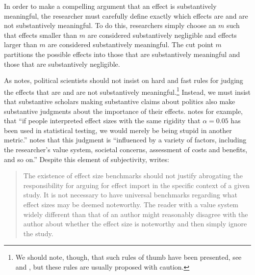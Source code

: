 \documentclass[12pt]{article}
\begin{document}
In order to make a compelling argument that an effect is substantively meaningful, the researcher must carefully define exactly which effects are and are not substantively meaningful. To do this, researchers simply choose an $m$ such that effects smaller than $m$ are considered substantively negligible and effects larger than $m$ are considered substantively meaningful. The cut point $m$ partitions the possible effects into those that are substantively meaningful and those that are substantively negligible.

As \cite{Rainey2014} notes, political scientists should not insist on hard and fast rules for judging the effects that are and are not substantively meaningful.\footnote{\normalbaselineskip We should note, though, that such rules of thumb have been presented, see \cite{Glass1976} and \cite{Cohen1992}, but these rules are usually proposed with caution.} Instead, we must insist that substantive scholars making substantive claims about politics also make substantive judgments about the importance of their effects. \citet[pp. 82-83]{Thompson2001} notes for example, that ``if people interpreted effect sizes with the same rigidity that $\alpha = 0.05$ has been used in statistical testing, we would merely be being stupid in another metric.'' \cite{Kirk1996} notes that this judgment is ``influenced by a variety of factors, including the researcher's value system, societal concerns, assessment of costs and benefits, and so on.'' Despite this element of subjectivity, \citet[p. 30]{Thompson2002} writes: 

\begin{quote}
The existence of effect size benchmarks should not justify abrogating the responsibility for arguing for effect import in the specific context of a given study. It is not necessary to have universal benchmarks regarding what effect sizes may be deemed noteworthy. The reader with a value system widely different than that of an author might reasonably disagree with the author about whether the effect size is noteworthy and then simply ignore the study.
\end{quote}
\end{document}
